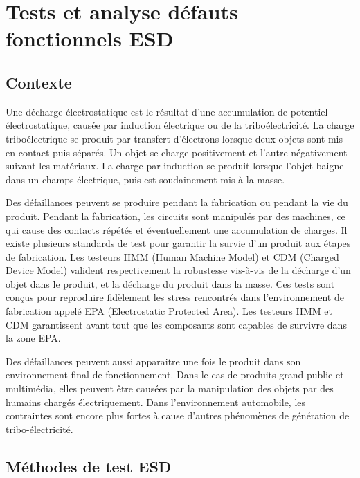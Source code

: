 \chapter{Tests et analyse défauts fonctionnels ESD}
\label{chap:1}
\section{Contexte}

Une décharge électrostatique est le résultat d'une accumulation de potentiel électrostatique, causée par induction électrique ou de la triboélectricité.
La charge triboélectrique se produit par transfert d'électrons lorsque deux objets sont mis en contact puis séparés.
Un objet se charge positivement et l'autre négativement suivant les matériaux.
La charge par induction se produit lorsque l'objet baigne dans un champs électrique, puis est soudainement mis à la masse.

Des défaillances peuvent se produire pendant la fabrication ou pendant la vie du produit.
Pendant la fabrication, les circuits sont manipulés par des machines, ce qui cause des contacts répétés et éventuellement une accumulation de charges.
Il existe plusieurs standards de test pour garantir la survie d'un produit aux étapes de fabrication.
Les testeurs HMM (Human Machine Model) et CDM (Charged Device Model) valident respectivement la robustesse vis-à-vis de la décharge d'un objet dans le produit, et la décharge du produit dans la masse.
Ces tests sont conçus pour reproduire fidèlement les stress rencontrés dans l'environnement de fabrication appelé EPA (Electrostatic Protected Area).
Les testeurs HMM et CDM garantissent avant tout que les composants sont capables de survivre dans la zone EPA.

Des défaillances peuvent aussi apparaitre une fois le produit dans son environnement final de fonctionnement.
Dans le cas de produits grand-public et multimédia, elles peuvent être causées par la manipulation des objets par des humains chargés électriquement.
Dans l'environnement automobile, les contraintes sont encore plus fortes à cause d'autres phénomènes de génération de tribo-électricité.

\section{Méthodes de test ESD}

